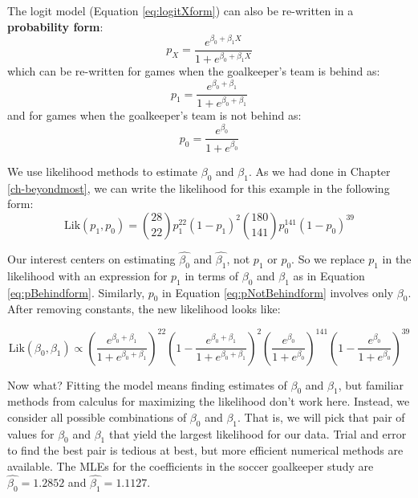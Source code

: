 \documentclass[
]{krantz}
\newcommand{\Lik}{\mathrm{Lik}}
\begin{document}
The logit model (Equation \eqref{eq:logitXform}) can also be re-written in a \textbf{probability form}:
\begin{equation} 
p_X=\frac{e^{\beta_0+\beta_1X}}{1+e^{\beta_0+\beta_1X}}
\label{eq:pXform}
\end{equation}
which can be re-written for games when the goalkeeper's team is behind as:
\begin{equation} 
p_1=\frac{e^{\beta_0+\beta_1}}{1+e^{\beta_0+\beta_1}}  
\label{eq:pBehindform}
\end{equation}
and for games when the goalkeeper's team is not behind as:
\begin{equation} 
p_0=\frac{e^{\beta_0}}{1+e^{\beta_0}}
\label{eq:pNotBehindform}
\end{equation}

We use likelihood methods to estimate \(\beta_0\) and \(\beta_1\). As we had done in Chapter \ref{ch-beyondmost}, we can write the likelihood for this example in the following form:
\[\Lik(p_1, p_0) = {28 \choose 22}p_1^{22}(1-p_1)^{2}
{180 \choose 141}p_0^{141}(1-p_0)^{39}\]

Our interest centers on estimating \(\hat{\beta_0}\) and \(\hat{\beta_1}\), not \(p_1\) or \(p_0\). So we replace \(p_1\) in the likelihood with an expression for \(p_1\) in terms of \(\beta_0\) and \(\beta_1\) as in Equation \eqref{eq:pBehindform}. Similarly, \(p_0\) in Equation \eqref{eq:pNotBehindform} involves only \(\beta_0\). After removing constants, the new likelihood looks like:

\begin{equation}
    \Lik(\beta_0,\beta_1) \propto \left( \frac{e^{\beta_0+\beta_1}}{1+e^{\beta_0+\beta_1}}\right)^{22}\left(1- \frac{e^{\beta_0+\beta_1}}{1+e^{\beta_0+\beta_1}}\right)^{2}
    \left(\frac{e^{\beta_0}}{1+e^{\beta_0}}\right)^{141}\left(1-\frac{e^{\beta_0}}{1+e^{\beta_0}}\right)^{39}
\label{eq:newlik}
\end{equation}

Now what? Fitting the model means finding estimates of \(\beta_0\) and \(\beta_1\), but familiar methods from calculus for maximizing the likelihood don't work here. Instead, we consider all possible combinations of \(\beta_0\) and \(\beta_1\). That is, we will pick that pair of values for \(\beta_0\) and \(\beta_1\) that yield the largest likelihood for our data. Trial and error to find the best pair is tedious at best, but more efficient numerical methods are available. The MLEs for the coefficients in the soccer goalkeeper study are \(\hat{\beta_0}= 1.2852\) and \(\hat{\beta_1}=1.1127\).
\end{document}
